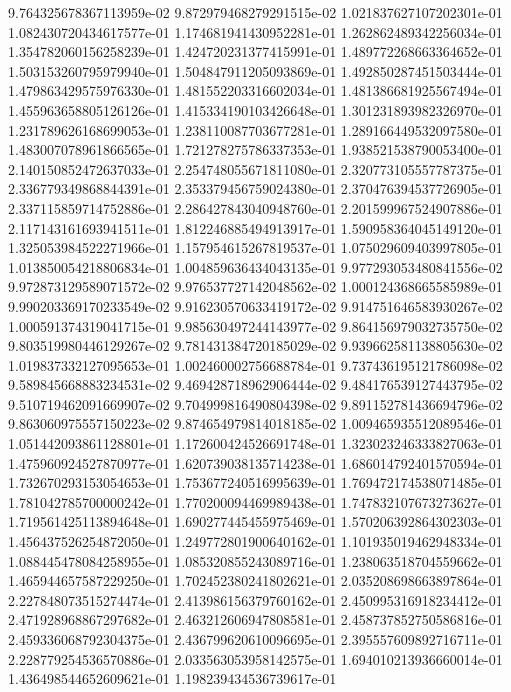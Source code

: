 9.764325678367113959e-02
9.872979468279291515e-02
1.021837627107202301e-01
1.082430720434617577e-01
1.174681941430952281e-01
1.262862489342256034e-01
1.354782060156258239e-01
1.424720231377415991e-01
1.489772268663364652e-01
1.503153260795979940e-01
1.504847911205093869e-01
1.492850287451503444e-01
1.479863429575976330e-01
1.481552203316602034e-01
1.481386681925567494e-01
1.455963658805126126e-01
1.415334190103426648e-01
1.301231893982326970e-01
1.231789626168699053e-01
1.238110087703677281e-01
1.289166449532097580e-01
1.483007078961866565e-01
1.721278275786337353e-01
1.938521538790053400e-01
2.140150852472637033e-01
2.254748055671811080e-01
2.320773105557787375e-01
2.336779349868844391e-01
2.353379456759024380e-01
2.370476394537726905e-01
2.337115859714752886e-01
2.286427843040948760e-01
2.201599967524907886e-01
2.117143161693941511e-01
1.812246885494913917e-01
1.590958364045149120e-01
1.325053984522271966e-01
1.157954615267819537e-01
1.075029609403997805e-01
1.013850054218806834e-01
1.004859636434043135e-01
9.977293053480841556e-02
9.972873129589071572e-02
9.976537727142048562e-02
1.000124368665585989e-01
9.990203369170233549e-02
9.916230570633419172e-02
9.914751646583930267e-02
1.000591374319041715e-01
9.985630497244143977e-02
9.864156979032735750e-02
9.803519980446129267e-02
9.781431384720185029e-02
9.939662581138805630e-02
1.019837332127095653e-01
1.002460002756688784e-01
9.737436195121786098e-02
9.589845668883234531e-02
9.469428718962906444e-02
9.484176539127443795e-02
9.510719462091669907e-02
9.704999816490804398e-02
9.891152781436694796e-02
9.863060975557150223e-02
9.874654979814018185e-02
1.009465935512089546e-01
1.051442093861128801e-01
1.172600424526691748e-01
1.323023246333827063e-01
1.475960924527870977e-01
1.620739038135714238e-01
1.686014792401570594e-01
1.732670293153054653e-01
1.753677240516995639e-01
1.769472174538071485e-01
1.781042785700000242e-01
1.770200094469989438e-01
1.747832107673273627e-01
1.719561425113894648e-01
1.690277445455975469e-01
1.570206392864302303e-01
1.456437526254872050e-01
1.249772801900640162e-01
1.101935019462948334e-01
1.088445478084258955e-01
1.085320855243089716e-01
1.238063518704559662e-01
1.465944657587229250e-01
1.702452380241802621e-01
2.035208698663897864e-01
2.227848073515274474e-01
2.413986156379760162e-01
2.450995316918234412e-01
2.471928968867297682e-01
2.463212606947808581e-01
2.458737852750586816e-01
2.459336068792304375e-01
2.436799620610096695e-01
2.395557609892716711e-01
2.228779254536570886e-01
2.033563053958142575e-01
1.694010213936660014e-01
1.436498544652609621e-01
1.198239434536739617e-01

